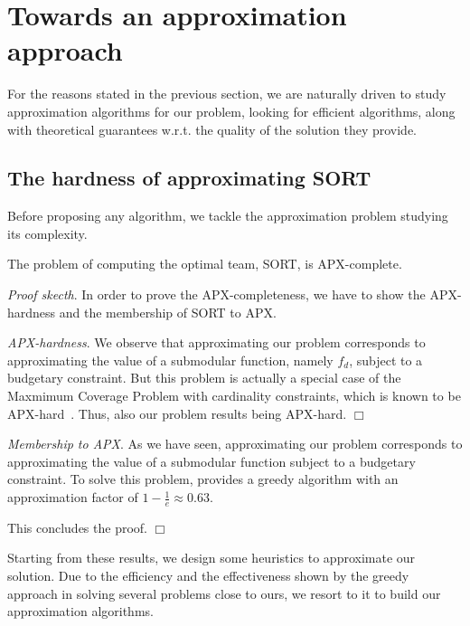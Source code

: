 \section{Towards an approximation approach}

For the reasons stated in the previous section, we are naturally driven to study approximation algorithms for our problem, looking for efficient algorithms, along with theoretical guarantees w.r.t. the quality of the solution they provide.

\subsection{The hardness of approximating SORT}
Before proposing any algorithm, we tackle the approximation problem studying its complexity.


\begin{theorem}\label{thm:apx_hardness}
The problem of computing the optimal team, SORT, is \textsf{APX}-complete.
\end{theorem}

\noindent
\textit{Proof skecth}. In order to prove the \textsf{APX}-completeness, we have to show the \textsf{APX}-hardness and the membership of SORT to \textsf{APX}.

\noindent
\textit{\textsf{APX}-hardness}. We observe that approximating our problem corresponds to approximating the value of a submodular function, namely $f_d$, subject to a budgetary constraint. But this problem is actually a special case of the Maxmimum Coverage Problem with cardinality constraints, which is known to be \textsf{APX}-hard~\cite{feige1998threshold}. Thus, also our problem results being \textsf{APX}-hard. \hfill $\Box$

\noindent
\textit{Membership to \textsf{APX}}. As we have seen, approximating our problem corresponds to approximating the value of a submodular function subject to a budgetary constraint. To solve this problem, \cite{khuller1999budgeted} provides a greedy algorithm with an approximation factor of $1-\frac{1}{e} \approx 0.63$.

This concludes the proof. \hfill $\Box$


Starting from these results, we design some heuristics to approximate our solution. Due to the efficiency and the effectiveness shown by the greedy approach in solving several problems close to ours, we resort to it to build our approximation algorithms. 


